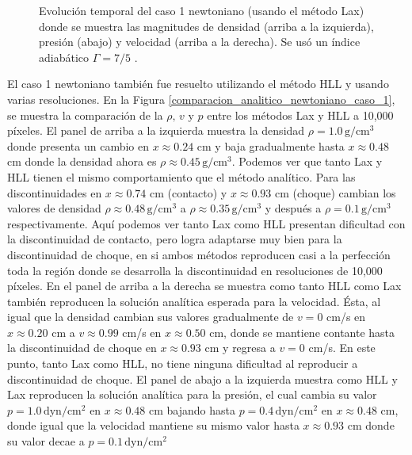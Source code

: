 \documentclass[12pt,a4paper]{book}
\begin{document}
\begin{figure}
      \caption{\label{caso_new_rar_shock} Evolución temporal del caso 1 newtoniano (usando el método Lax) donde se muestra
      las magnitudes de densidad (arriba a la izquierda), presión (abajo) y 
      velocidad (arriba a la derecha). 
      Se usó un índice adiabático $\Gamma = 7/5$ .}
  \end{figure}

  El caso 1 newtoniano también fue resuelto utilizando el método HLL y usando varias resoluciones. 
  En la Figura 
  \ref{comparacion_analitico_newtoniano_caso_1}, se muestra la comparación de la $\rho, \, v$ y $p$
  entre los métodos Lax 
  y HLL a 10,000 píxeles. 
  El panel de arriba a la izquierda muestra la densidad $\rho = 1.0 \,  \text{g}/ \text{cm}^3$ 
  donde presenta un cambio en 
  $x \approx 0.24 $ cm y baja gradualmente hasta $x \approx 0.48$ cm donde la densidad ahora es $\rho \approx
  0.45 \,  \text{g}/ \text{cm}^3$.  Podemos ver que tanto Lax y HLL tienen el 
  mismo comportamiento
  que el método analítico. 
  Para las discontinuidades en $x \approx 0.74$ cm (contacto) y $x \approx 0.93$ cm (choque) cambian los valores de densidad $
  \rho \approx 0.48 \,  \text{g}/ \text{cm}^3$ a $\rho \approx 0.35 \,  \text{g}/ \text{cm}^3$ y 
  después a $\rho =0.1 \,  \text{g}/ \text{cm}^3$ 
  respectivamente. Aquí podemos ver
  tanto Lax como HLL presentan dificultad con la discontinuidad de contacto, 
  pero logra adaptarse muy bien para la discontinuidad de choque, en si ambos métodos reproducen 
  casi a 
  la perfección toda la región donde se desarrolla la discontinuidad en resoluciones de 10,000 píxeles.
  En el panel de arriba a la derecha se muestra como tanto HLL como Lax también reproducen la 
  solución analítica esperada para
  la velocidad. Ésta, al igual que la densidad cambian 
  sus valores gradualmente de $v = 0$ cm/s en $x \approx 0.20$ cm a $v \approx 0.99$ cm/s en 
  $x \approx 0.50$ cm,
  donde se mantiene contante hasta la discontinuidad de choque en $x \approx 0.93$ cm y regresa a $v = 0$ cm/s.
  En este punto, tanto Lax como HLL, no tiene ninguna dificultad al reproducir a discontinuidad de 
  choque.
  El panel de abajo a la izquierda muestra como HLL y Lax reproducen la solución 
  analítica para
  la presión, el cual cambia su valor 
  $p = 1.0 \,  \text{dyn}/ \text{cm}^2 $ en $x \approx 0.48$ cm
  bajando hasta $p = 0.4 \,  \text{dyn}/ \text{cm}^2 $ en $x \approx 0.48$ cm, 
  donde igual que la velocidad
  mantiene su mismo valor hasta $x \approx 0.93$ cm donde su valor decae a $p = 0.1 \,  \text{dyn}/ \text{cm}^2 $
\end{document}
